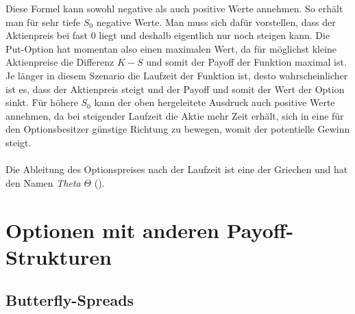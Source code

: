 \documentclass[11pt]{report} %
\begin{document}
Diese Formel kann sowohl negative als auch positive Werte annehmen. So erhält man für sehr tiefe $S_0$ negative Werte. Man muss sich dafür vorstellen, dass der Aktienpreis bei fast $0$ liegt und deshalb eigentlich nur noch steigen kann. Die Put-Option hat momentan also einen maximalen Wert, da für möglichst kleine Aktienpreise die Differenz $K-S$ und somit der Payoff der Funktion maximal ist. Je länger in diesem Szenario die Laufzeit der Funktion ist, desto wahrscheinlicher ist es, dass der Aktienpreis steigt und der Payoff und somit der Wert der Option sinkt. Für höhere $S_0$ kann der oben hergeleitete Ausdruck auch positive Werte annehmen, da bei steigender Laufzeit die Aktie mehr Zeit erhält, sich in eine für den Optionsbesitzer günstige Richtung zu bewegen, womit der potentielle Gewinn steigt.\\\\Die Ableitung des Optionspreises nach der Laufzeit ist eine der Griechen und hat den Namen \textit{Theta} $\Theta$ (\cite{hayes2023}).

\chapter{Optionen mit anderen Payoff-Strukturen}
\section{Butterfly-Spreads}
\end{document}
